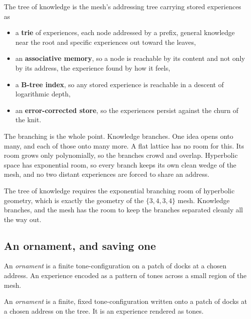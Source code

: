 \begin{definition}
The tree of knowledge is the mesh's addressing tree carrying stored experiences as
\begin{itemize}
\item a \textbf{trie} of experiences, each node addressed by a prefix, general knowledge near the root and specific experiences out toward the leaves,
\item an \textbf{associative memory}, so a node is reachable by its content and not only by its address, the experience found by how it feels,
\item a \textbf{B-tree index}, so any stored experience is reachable in a descent of logarithmic depth,
\item an \textbf{error-corrected store}, so the experiences persist against the churn of the knit.
\end{itemize}
\end{definition}

The branching is the whole point. Knowledge branches. One idea opens onto many, and each of those onto many more. A flat lattice has no room for this. Its room grows only polynomially, so the branches crowd and overlap. Hyperbolic space has exponential room, so every branch keeps its own clean wedge of the mesh, and no two distant experiences are forced to share an address.

\begin{result}
The tree of knowledge requires the exponential branching room of hyperbolic geometry, which is exactly the geometry of the $\{3,4,3,4\}$ mesh. Knowledge branches, and the mesh has the room to keep the branches separated cleanly all the way out.
\end{result}

\subsection{An ornament, and saving one}

An \emph{ornament} is a finite tone-configuration on a patch of docks at a chosen address. An experience encoded as a pattern of tones across a small region of the mesh.

\begin{definition}[Ornament]
An \emph{ornament} is a finite, fixed tone-configuration written onto a patch of docks at a chosen address on the tree. It is an experience rendered as tones.
\end{definition}

